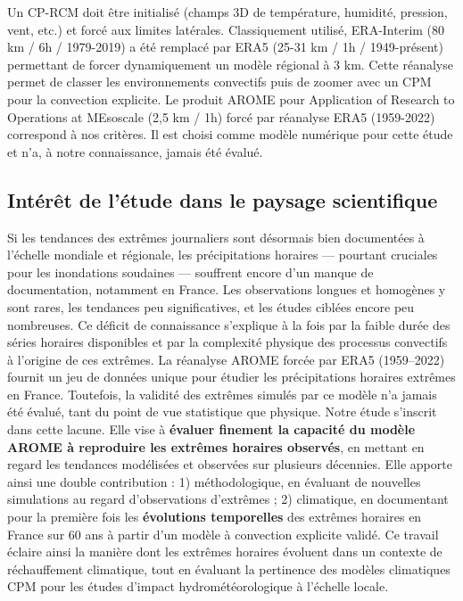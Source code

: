 \documentclass[
  article,
  nofooter,
  noheadings]{jss}
\begin{document}
Un CP-RCM doit être initialisé (champs 3D de température, humidité,
pression, vent, etc.) et forcé aux limites latérales. Classiquement
utilisé, ERA-Interim (80 km / 6h / 1979-2019) a été remplacé par ERA5
(25-31 km / 1h / 1949-présent) permettant de forcer dynamiquement un
modèle régional à 3 km. Cette réanalyse permet de classer les
environnements convectifs \citep{ecmwf_era5_data_documentation} puis de
zoomer avec un CPM pour la convection explicite. Le produit AROME pour
Application of Research to Operations at MEsoscale (2,5 km / 1h) forcé
par réanalyse ERA5 (1959-2022) correspond à nos critères. Il est choisi
comme modèle numérique pour cette étude et n'a, à notre connaissance,
jamais été évalué.

\subsection{Intérêt de l'étude dans le paysage
scientifique}\label{intuxe9ruxeat-de-luxe9tude-dans-le-paysage-scientifique}

Si les tendances des extrêmes journaliers sont désormais bien
documentées à l'échelle mondiale et régionale, les précipitations
horaires --- pourtant cruciales pour les inondations soudaines ---
souffrent encore d'un manque de documentation, notamment en France. Les
observations longues et homogènes y sont rares, les tendances peu
significatives, et les études ciblées encore peu nombreuses. Ce déficit
de connaissance s'explique à la fois par la faible durée des séries
horaires disponibles et par la complexité physique des processus
convectifs à l'origine de ces extrêmes. La réanalyse AROME forcée par
ERA5 (1959--2022) fournit un jeu de données unique pour étudier les
précipitations horaires extrêmes en France. Toutefois, la validité des
extrêmes simulés par ce modèle n'a jamais été évalué, tant du point de
vue statistique que physique. Notre étude s'inscrit dans cette lacune.
Elle vise à \textbf{évaluer finement la capacité du modèle AROME à
reproduire les extrêmes horaires observés}, en mettant en regard les
tendances modélisées et observées sur plusieurs décennies. Elle apporte
ainsi une double contribution : 1) méthodologique, en évaluant de
nouvelles simulations au regard d'observations d'extrêmes ; 2)
climatique, en documentant pour la première fois les \textbf{évolutions
temporelles} des extrêmes horaires en France sur 60 ans à partir d'un
modèle à convection explicite validé. Ce travail éclaire ainsi la
manière dont les extrêmes horaires évoluent dans un contexte de
réchauffement climatique, tout en évaluant la pertinence des modèles
climatiques CPM pour les études d'impact hydrométéorologique à l'échelle
locale.
\end{document}
